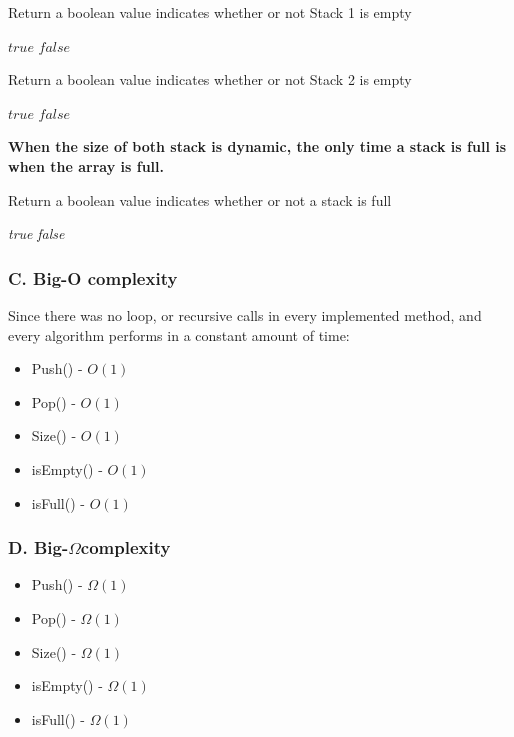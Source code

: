 \documentclass[16pt, letterpaper]{article}
\begin{document}
\begin{algorithm} [H]
\caption{Return a boolean value indicates whether or not Stack 1 is empty}
\begin{algorithmic}
    \State \Return $\textit{true}$
    \Else
    \State \Return $\textit{false}$
    \EndIf
    \EndProcedure
\end{algorithmic}
\end{algorithm}

\begin{algorithm} [H]
\caption{Return a boolean value indicates whether or not Stack 2 is empty}
\begin{algorithmic}
    \State \Return $\textit{true}$
    \Else
    \State \Return $\textit{false}$
    \EndIf
    \EndProcedure
\end{algorithmic}
\end{algorithm}

\textbf{When the size of both stack is dynamic, the only time a stack is full is when the array is full.}
\begin{algorithm} [H]
\caption{Return a boolean value indicates whether or not a stack is full}
\begin{algorithmic}
    \State \Return \textit{true}
    \Else
    \State \Return \textit{false}
    \EndIf
    \EndProcedure
\end{algorithmic}
\end{algorithm}

\subsubsection*{C. Big-O complexity}
Since there was no loop, or recursive calls in every implemented method, and every algorithm performs in a constant amount of time:
\begin{itemize}
    \item Push() - $O(1)$
    \item Pop() - $O(1)$
    \item Size() - $O(1)$
    \item isEmpty() - $O(1)$
    \item isFull() - $O(1)$
\end{itemize}

\subsubsection*{D. Big-$\Omega$complexity}
\begin{itemize}
    \item Push() - $\Omega(1)$
    \item Pop() - $\Omega(1)$
    \item Size() - $\Omega(1)$
    \item isEmpty() - $\Omega(1)$
    \item isFull() - $\Omega(1)$
\end{itemize}
\end{document}

